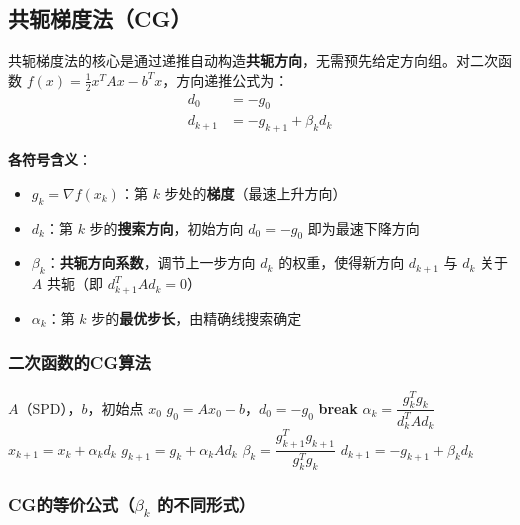 \subsection{共轭梯度法（CG）}\label{sec:cg}

\begin{conceptbox}[共轭梯度法]
共轭梯度法的核心是通过递推自动构造\textbf{共轭方向}，无需预先给定方向组。对二次函数 $f(x) = \frac{1}{2}x^T A x - b^T x$，方向递推公式为：
\begin{align*}
d_0 &= -g_0 \\
d_{k+1} &= -g_{k+1} + \beta_k d_k
\end{align*}

\textbf{各符号含义}：
\begin{itemize}[itemsep=0.2em]
    \item $g_k = \nabla f(x_k)$：第 $k$ 步处的\textbf{梯度}（最速上升方向）
    \item $d_k$：第 $k$ 步的\textbf{搜索方向}，初始方向 $d_0 = -g_0$ 即为最速下降方向
    \item $\beta_k$：\textbf{共轭方向系数}，调节上一步方向 $d_k$ 的权重，使得新方向 $d_{k+1}$ 与 $d_k$ 关于 $A$ 共轭（即 $d_{k+1}^T A d_k = 0$）
    \item $\alpha_k$：第 $k$ 步的\textbf{最优步长}，由精确线搜索确定
\end{itemize}
\end{conceptbox}

\subsubsection{二次函数的CG算法}

\begin{algorithm}[H]
\caption{线性共轭梯度法}
\begin{algorithmic}[1]
\Require $A$（SPD），$b$，初始点 $x_0$
\State $g_0 = Ax_0 - b$，$d_0 = -g_0$
     \textbf{break} \EndIf
    \State $\alpha_k = \dfrac{g_k^T g_k}{d_k^T A d_k}$
    \State $x_{k+1} = x_k + \alpha_k d_k$
    \State $g_{k+1} = g_k + \alpha_k A d_k$
    \State $\beta_k = \dfrac{g_{k+1}^T g_{k+1}}{g_k^T g_k}$
    \State $d_{k+1} = -g_{k+1} + \beta_k d_k$
\EndFor
\end{algorithmic}
\end{algorithm}

\subsubsection{CG的等价公式（$\beta_k$ 的不同形式）}


